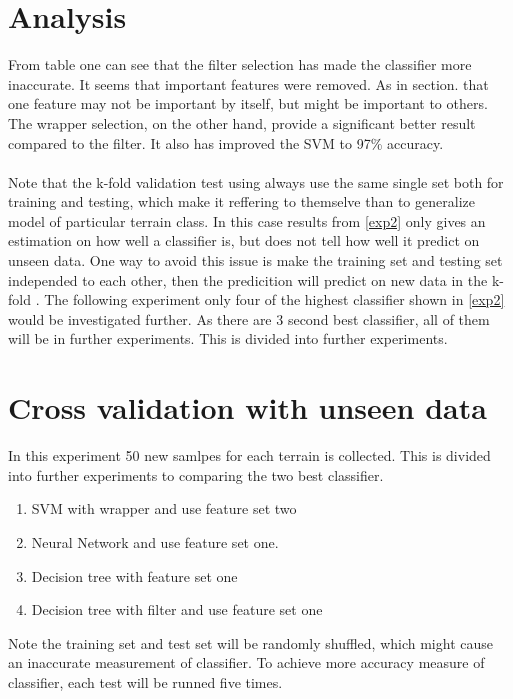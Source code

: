 \documentclass[USenglish]{ifimaster}  %
\begin{document}
\section{Analysis}
From table \label{exp2} one can see that the filter selection has made the classifier more inaccurate. It seems that important features were removed. As in section. that one feature may not be important by itself, but might be important to others. The wrapper selection, on the other hand, provide a significant better result compared to the filter. It also has improved the SVM to 97\% accuracy.
\\
\\
Note that the k-fold validation test using always use the same single set both for training and testing, which make it reffering to themselve than to generalize model of particular terrain class. In this case results from \ref{exp2} only gives an estimation on how well a classifier is, but does not tell how well it predict on unseen data. One way to avoid this issue is make the training set and testing set independed to each other, then the predicition will predict on new data in the k-fold \cite{hexapod}. The following experiment only four of the highest classifier shown in \ref{exp2} would be investigated further. As there are 3 second best classifier, all of them will be in further experiments. This is divided into further experiments.

\section{Cross validation with unseen data}
In this experiment 50 new samlpes for each terrain is collected. This is divided into further experiments to comparing the two best classifier.

\begin{enumerate}
\item SVM with wrapper and use feature set two
\item Neural Network and use feature set one.
\item Decision tree with feature set one
\item Decision tree with filter and use feature set one
\end{enumerate}
Note the training set and test set will be randomly shuffled, which might cause an inaccurate measurement of classifier. To achieve more accuracy measure of classifier, each test will be runned five times.
\end{document}
